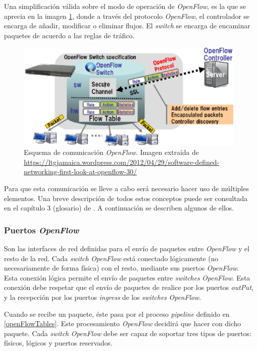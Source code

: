 \documentclass[a4paper,11pt]{book}
\begin{document}
Una simplificación válida sobre el modo de operación de \emph{OpenFlow}, es la que se aprecia en la imagen \ref{openflowComu}, donde a través del protocolo \emph{OpenFlow}, el controlador se encarga de añadir, modificar o eliminar flujos. El \textit{switch} se encarga de encaminar paquetes de acuerdo a las reglas de tráfico.  

\begin{figure}[tb]
\centering
\includegraphics[scale=0.55]{./figuras/openflowComu}
\caption[Esquema de comunicación \emph{OpenFlow}]{Esquema de comunicación \emph{OpenFlow}. Imagen extraída de  \url{https://ltgjamaica.wordpress.com/2012/04/29/software-defined-networking-first-look-at-openflow-30/}}\label{openflowComu}
\end{figure}

Para que esta comunicación se lleve a cabo será necesario hacer uso de múltiples elementos. Una breve descripción de todos estos conceptos puede ser consultada en el capítulo 3 (glosario) de \cite{openflow13}. A continuación se describen algunos de ellos.

\subsubsection{Puertos \emph{OpenFlow}} 

Son las interfaces de red definidas para el envío de paquetes entre \emph{OpenFlow} y el resto de la red. Cada \textit{switch} \emph{OpenFlow} está conectado lógicamente (no necesariamente de forma física) con el resto, mediante sus puertos \emph{OpenFlow}. Esta conexión lógica permite el envío de paquetes entre \textit{switches} \emph{OpenFlow}. Esta conexión debe respetar que el envío de paquetes de realice por los puertos \textit{outPut}, y la recepcción por los puertos \textit{ingress} de los \textit{switches} \emph{OpenFlow}. 

Cuando se recibe un paquete, éste pasa por el proceso \textit{pipeline} definido en \ref{openFlowTables}. Este procesamiento \emph{OpenFlow} decidirá que hacer con dicho paquete. Cada \textit{switch} \emph{OpenFlow} debe ser capaz de soportar tres tipos de puertos: físicos, lógicos y puertos reservados.
\end{document}
